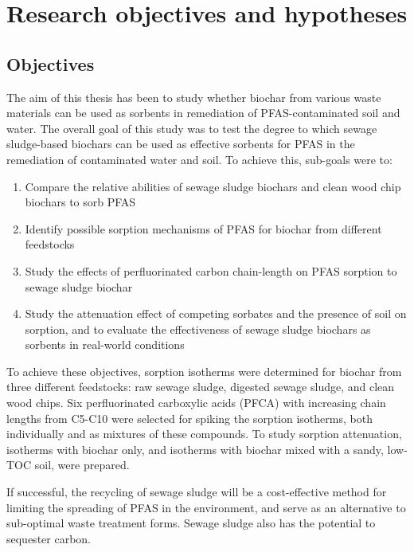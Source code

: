 \chapter{Research objectives and hypotheses}\label{chap:Objectives}
\section{Objectives}\label{sec:objectives}
The aim of this thesis has been to study whether biochar from various waste materials can be used as sorbents in remediation of PFAS-contaminated soil and water. The overall goal of this study was to test the degree to which sewage sludge-based biochars can be used as effective sorbents for PFAS in the remediation of contaminated water and soil. To achieve this, sub-goals were to:

\begin{enumerate}[label=\Roman*]
    \item{Compare the relative abilities of sewage sludge biochars and clean wood chip biochars to sorb PFAS}
    \item{Identify possible sorption mechanisms of PFAS for biochar from different feedstocks}
    \item{Study the effects of perfluorinated carbon chain-length on PFAS sorption to sewage sludge biochar}
    \item{Study the attenuation effect of competing sorbates and the presence of soil on sorption, and to evaluate the effectiveness of sewage sludge biochars as sorbents in real-world conditions}
\end{enumerate}

To achieve these objectives, sorption isotherms were determined for biochar from three different feedstocks: raw sewage sludge, digested sewage sludge, and clean wood chips. Six perfluorinated carboxylic acids (PFCA) with increasing chain lengths from C5-C10 were selected for spiking the sorption isotherms, both individually and as mixtures of these compounds. To study sorption attenuation, isotherms with biochar only, and isotherms with biochar mixed with a sandy, low-TOC soil, were prepared.

If successful, the recycling of sewage sludge will be a cost-effective method for limiting the spreading of PFAS in the environment, and serve as an alternative to sub-optimal waste treatment forms. Sewage sludge also has the potential to sequester carbon.

